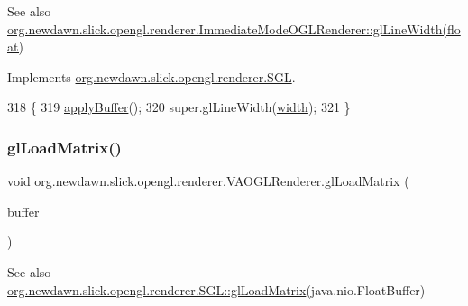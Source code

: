 \begin{DoxySeeAlso}{See also}
\mbox{\hyperlink{classorg_1_1newdawn_1_1slick_1_1opengl_1_1renderer_1_1_immediate_mode_o_g_l_renderer_a31bc611222a137427b8795f830af7eb7}{org.\+newdawn.\+slick.\+opengl.\+renderer.\+Immediate\+Mode\+O\+G\+L\+Renderer\+::gl\+Line\+Width(float)}} 
\end{DoxySeeAlso}


Implements \mbox{\hyperlink{interfaceorg_1_1newdawn_1_1slick_1_1opengl_1_1renderer_1_1_s_g_l_a6c064bfcda5e00a6b94f15f0c3b448f4}{org.\+newdawn.\+slick.\+opengl.\+renderer.\+S\+GL}}.


\begin{DoxyCode}
318                                          \{
319         \mbox{\hyperlink{classorg_1_1newdawn_1_1slick_1_1opengl_1_1renderer_1_1_v_a_o_g_l_renderer_a7c5d09419cd40761be8f849631aebab5}{applyBuffer}}();
320         super.glLineWidth(\mbox{\hyperlink{classorg_1_1newdawn_1_1slick_1_1opengl_1_1renderer_1_1_immediate_mode_o_g_l_renderer_a65d0a04d747368ea954f69074d9102d6}{width}});
321     \}
\end{DoxyCode}
\mbox{\label{classorg_1_1newdawn_1_1slick_1_1opengl_1_1renderer_1_1_v_a_o_g_l_renderer_ac5401989bccd77b9d35db9b998d5fa4c}} 
\subsubsection{\texorpdfstring{gl\+Load\+Matrix()}{glLoadMatrix()}}
{\footnotesize\ttfamily void org.\+newdawn.\+slick.\+opengl.\+renderer.\+V\+A\+O\+G\+L\+Renderer.\+gl\+Load\+Matrix (\begin{DoxyParamCaption}\item[{Float\+Buffer}]{buffer }\end{DoxyParamCaption})\hspace{0.3cm}{\ttfamily [inline]}}

\begin{DoxySeeAlso}{See also}
\mbox{\hyperlink{interfaceorg_1_1newdawn_1_1slick_1_1opengl_1_1renderer_1_1_s_g_l_a41baff345ccbf53de61ebb3c77e02914}{org.\+newdawn.\+slick.\+opengl.\+renderer.\+S\+G\+L\+::gl\+Load\+Matrix}}(java.\+nio.\+Float\+Buffer) 
\end{DoxySeeAlso}


